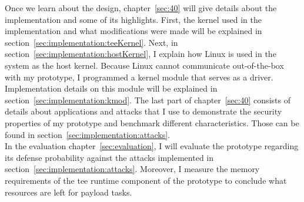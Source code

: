 Once we learn about the design, chapter~\ref{sec:40} will give
details about the implementation and some of its highlights. First, the kernel
used in the implementation and what modifications were made will be
explained in section~\ref{sec:implementation:teeKernel}. Next, in
section~\ref{sec:implementation:hostKernel}, I explain how Linux is used in the
system as the host kernel. Because Linux cannot communicate
out-of-the-box with my prototype, I programmed a kernel module that serves as a
driver. Implementation details on this module will be explained in
section~\ref{sec:implementation:kmod}. The last part of chapter~\ref{sec:40}
consists of details about applications and attacks that I use to demonstrate the
security properties of my prototype and benchmark different characteristics.
Those can be found in section~\ref{sec:implementation:attacks}. \\

In the evaluation chapter~\ref{sec:evaluation}, I will evaluate the prototype
regarding its defense probability against the attacks implemented in
section~\ref{sec:implementation:attacks}. Moreover, I measure the memory
requirements of the \gls{tee} runtime component of the prototype to conclude
what resources are left for payload tasks. 

